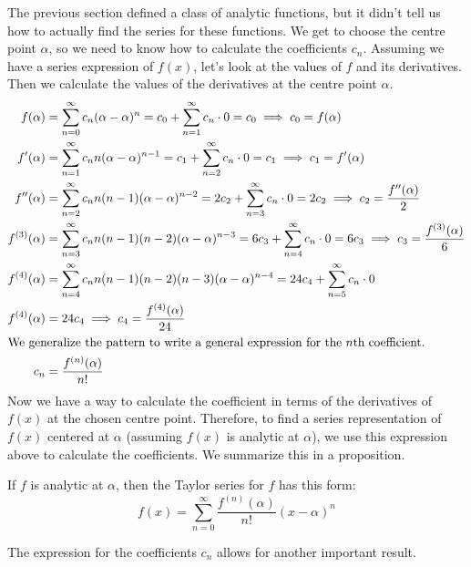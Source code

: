 \documentclass[fleqn,letterpaper]{report}
\begin{document}
The previous section defined a class of analytic functions,
but it didn't tell us how to actually find the series for
these functions. We get to choose the centre point $\alpha$,
so we need to know how to calculate the
coefficients $c_n$. Assuming we have a series expression of
$f(x)$, let's look at the values of $f$ and its derivatives.
Then we calculate the values of the derivatives at the centre
point $\alpha$. 
\begin{align*}
f(\alpha) & = \sum_{n=0}^\infty c_n (\alpha-\alpha)^n = c_0 +
\sum_{n=1}^\infty c_n \cdot 0 = c_0 \implies c_0 = f(\alpha)
\\
f^{\prime} (\alpha) & = \sum_{n=1}^\infty c_n n
(\alpha-\alpha)^{n-1} = c_1 + \sum_{n=2}^\infty c_n \cdot 0 =
c_1 \implies c_1 = f^\prime(\alpha) \\
f^{\prime \prime} (\alpha) & = \sum_{n=2}^\infty c_n n (n-1)
(\alpha-\alpha)^{n-2} = 2c_2 + \sum_{n=3}^\infty c_n \cdot 0 =
2c_2 \implies c_2 = \frac{f^{\prime\prime}(\alpha)}{2} \\
f^{(3)} (\alpha) & = \sum_{n=3}^\infty c_n n (n-1) (n-2)
(\alpha-\alpha)^{n-3} = 6c_3 + \sum_{n=4}^\infty c_n \cdot 0 =
6c_3 \implies c_3 = \frac{f^{(3)}(\alpha)}{6} \\
f^{(4)} (\alpha) & = \sum_{n=4}^\infty c_n n (n-1) (n-2) (n-3)
(\alpha-\alpha)^{n-4} = 24c_4 + \sum_{n=5}^\infty c_n \cdot 0
\\
f^{(4)} (\alpha) & = 24c_4 \implies c_4 =
\frac{f^{(4)}(\alpha)}{24} \\
\intertext{We generalize the pattern to write a general
expression for the $n$th coefficient.}
c_n & = \frac{f^{(n)}(\alpha)}{n!} 
\end{align*}
Now we have a way to calculate the coefficient in terms of
the derivatives of $f(x)$ at the chosen centre point.
Therefore, to find a series representation of $f(x)$ centered
at $\alpha$ (assuming $f(x)$ is analytic at $\alpha$), we use
this expression above to calculate the coefficients. We
summarize this in a proposition.

\begin{prop}
If $f$ is analytic at $\alpha$, then the Taylor series for $f$
has this form:
\begin{equation*}
f(x) = \sum_{n=0}^\infty \frac{f^{(n)}(\alpha)}{n!}
(x-\alpha)^n
\end{equation*}
\end{prop}

The expression for the coefficients $c_n$ allows for another
important result.
\end{document}
